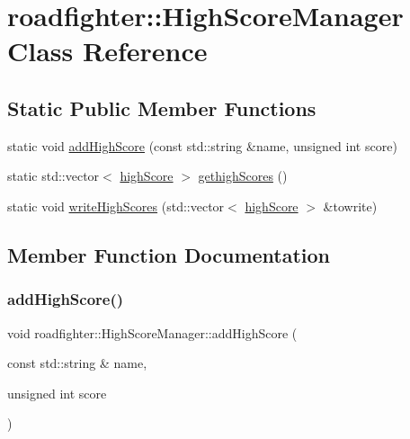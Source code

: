 \hypertarget{classroadfighter_1_1HighScoreManager}{}\section{roadfighter\+:\+:High\+Score\+Manager Class Reference}
\label{classroadfighter_1_1HighScoreManager}
\subsection*{Static Public Member Functions}
\begin{DoxyCompactItemize}
\item 
static void \hyperlink{classroadfighter_1_1HighScoreManager_a9c40cba8af2b9db8bf76ed81c250f52d}{add\+High\+Score} (const std\+::string \&name, unsigned int score)
\item 
static std\+::vector$<$ \hyperlink{structroadfighter_1_1highScore}{high\+Score} $>$ \hyperlink{classroadfighter_1_1HighScoreManager_af5f73f94d50829ec3f13792c5fbb33bb}{gethigh\+Scores} ()
\item 
static void \hyperlink{classroadfighter_1_1HighScoreManager_aa3b964a1c4631093aa2542a0cd8c4f00}{write\+High\+Scores} (std\+::vector$<$ \hyperlink{structroadfighter_1_1highScore}{high\+Score} $>$ \&towrite)
\end{DoxyCompactItemize}


\subsection{Member Function Documentation}
\mbox{\label{classroadfighter_1_1HighScoreManager_a9c40cba8af2b9db8bf76ed81c250f52d}} 
\subsubsection{\texorpdfstring{add\+High\+Score()}{addHighScore()}}
{\footnotesize\ttfamily void roadfighter\+::\+High\+Score\+Manager\+::add\+High\+Score (\begin{DoxyParamCaption}\item[{const std\+::string \&}]{name,  }\item[{unsigned int}]{score }\end{DoxyParamCaption})\hspace{0.3cm}{\ttfamily [static]}}

